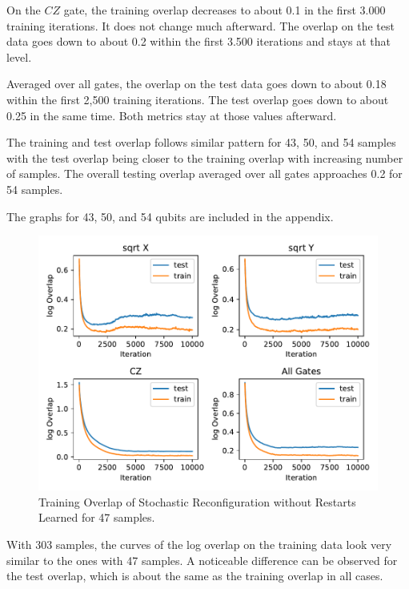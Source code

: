 On the $CZ$ gate, the training overlap decreases to about 0.1 in the first 3.000 training iterations. It does 
not change much afterward. The overlap on the test data goes down to about 0.2 within the first 3.500 iterations 
and stays at that level.

Averaged over all gates, the overlap on the test data goes down to about 0.18 within the first 2,500 training iterations. 
The test overlap goes down to about 0.25 in the same time. Both metrics stay at those values afterward.

The training and test overlap follows similar pattern for 43, 50, and 54 samples with the 
test overlap being closer to the training overlap with increasing number of samples. The overall
testing overlap averaged over all gates approaches 0.2 for 54 samples.

The graphs for 43, 50, and 54 qubits are included in the appendix.

\begin{figure}[H]
  \centering
  \includegraphics[width=\textwidth]{figures/results/SR-no-restarts-learned/avgOverlap_47.pdf}
  \caption[Training Overlap of Stochastic Reconfiguration without Restarts Learned]{Training 
  Overlap of Stochastic Reconfiguration without Restarts Learned for 47 samples.}
  \label{fig:sr_tvd}
\end{figure}

With 303 samples, the curves of the log overlap on the training data look very similar to the 
ones with 47 samples. A noticeable difference can be observed for the test overlap, which is 
about the same as the training overlap in all cases.

